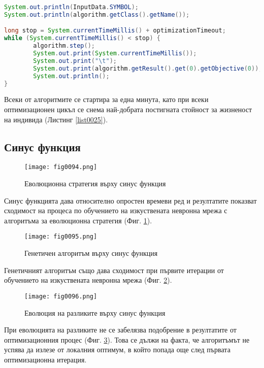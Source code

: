 \begin{lstlisting}[caption=Отчитане на междинните стойности в процеса по оптимизация, language=Java, basicstyle=\tiny, label=list0025]
System.out.println(InputData.SYMBOL);
System.out.println(algorithm.getClass().getName());

long stop = System.currentTimeMillis() + optimizationTimeout;
while (System.currentTimeMillis() < stop) {
        algorithm.step();
        System.out.print(System.currentTimeMillis());
        System.out.print("\t");
        System.out.print(algorithm.getResult().get(0).getObjective(0));
        System.out.println();
}
\end{lstlisting}

Всеки от алгоритмите се стартира за една минута, като при всеки оптимизационен цикъл се снема най-добрата постигната стойност за жизненост на индивида (Листинг \ref{list0025}).

\subsection{Синус функция}

\begin{figure}[H]
  \centering
  \texttt{[image: fig0094.png]}
  \caption{Еволюционна стратегия върху синус функция}
\label{fig0094}
\end{figure}

Синус функцията дава относително опростен времеви ред и резултатите показват сходимост на процеса по обучението на изкуствената невронна мрежа с алгоритъма за еволюционна стратегия (Фиг. \ref{fig0094}).

\begin{figure}[H]
  \centering
  \texttt{[image: fig0095.png]}
  \caption{Генетичен алгоритъм върху синус функция}
\label{fig0095}
\end{figure}

Генетичният алгоритъм също дава сходимост при първите итерации от обучението на изкуствената невронна мрежа (Фиг. \ref{fig0095}).

\begin{figure}[H]
  \centering
  \texttt{[image: fig0096.png]}
  \caption{Еволюция на разликите върху синус функция}
\label{fig0096}
\end{figure}

При еволюцията на разликите не се забелязва подобрение в резултатите от оптимизационния процес (Фиг. \ref{fig0096}). Това се дължи на факта, че алгоритъмът не успява да излезе от локалния оптимум, в който попада още след първата оптимизационна итерация. 

